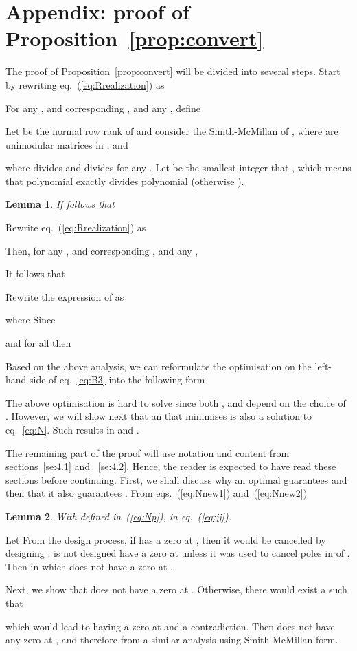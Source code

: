 \documentclass[twocolumn,12pt]{autart}
\theoremstyle{plain}
\newtheorem{lemma}{Lemma}
\newenvironment{proof}[1][Proof]{\begin{trivlist} \item[\hskip \labelsep {\bfseries #1}]}{\end{trivlist}}
\begin{document}
\section{Appendix: proof of Proposition~\ref{prop:convert}}\label{se:AppB}
The proof of Proposition~\ref{prop:convert} will be divided into several steps. Start by rewriting eq.~(\ref{eq:Rrealization}) as

For any , and corresponding , and any , define

Let  be the normal row rank of  and consider the Smith-McMillan of ,
where  are unimodular matrices in , and  

where  divides  and  divides  for any . Let  be the smallest integer that , which means that polynomial  exactly divides polynomial  (otherwise ).

\begin{lemma}\label{lemma1}
If follows that

\end{lemma}

\begin{proof}
Rewrite eq.~(\ref{eq:Rrealization}) as

Then, for any , and corresponding , and any ,

It follows that 

Rewrite the expression of  as

where  
Since 

and  for all 
then

Based on the above analysis, we can reformulate the optimisation on the left-hand side of eq.~\eqref{eq:B3} into the following form


\end{proof}

The above optimisation is hard to solve since both ,  and  depend on the choice of . However, we will show next that an  that minimises  is also a solution to eq.~\eqref{eq:N}. Such  results in  and . 

The remaining part of the proof will use notation and content from sections~\ref{se:4.1} and ~\ref{se:4.2}. Hence, the reader is expected to have read these sections before continuing.  First, we shall discuss why an optimal  guarantees  and then that it also guarantees . From eqs.~(\ref{eq:Nnew1}) and~(\ref{eq:Nnew2})





\begin{lemma}
With  defined in~(\ref{eq:Np}),  in eq.~(\ref{eq:jj}).
\end{lemma}
\begin{proof}
Let
From the design process, if  has a zero at , then it would be cancelled by designing .  is not designed have a zero at  unless it was used to cancel poles in  of . Then  in which  does not have a zero at .

Next, we show that  does not have a zero at . Otherwise, there would exist a  such that 

which would lead to  having a zero at  and a contradiction. Then  does not have any zero at , and therefore  from a similar analysis using Smith-McMillan form.

\end{proof}
\end{document}
